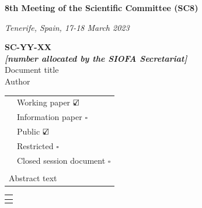 \documentclass[english,12pt,a4paper,final,twoside,titlepage,pdftex]{article}
\newcommand\CheckBoxTick{$\text{\rlap{$\checkmark$}}\square$}
\newcommand\CheckBoxUntick{$\square$}
\begin{document}
	\sloppy %

	
  \begin{center}
		\thispagestyle{firststyle}
		\vspace*{2cm}
		\small{\textbf{8th Meeting of the Scientific Committee (SC8)}}

		\vspace*{0.25cm}
		\emph{Tenerife, Spain, 17-18 March 2023}
		
		\vspace*{1cm}
		\textbf{SC-YY-XX\\ \emph{[number allocated by the SIOFA Secretariat]}}\\
		\vspace*{0.5cm}	
		\huge{Document title} \\
		\vspace*{1cm}	
		\large{Author}
  \end{center}

	\begin{table}[H]
	  \begin{tabular}{|m{4cm}|m{10cm}|}
		  \hline
	  	\textbf{\color{blue}{Document type}} &  Working paper \CheckBoxTick \\
	  	& Information paper \CheckBoxUntick \\
      \hline
      \textbf{\color{blue}{Distribution}} & Public \CheckBoxTick \\
      & Restricted \footnotemark[1] \CheckBoxUntick\\
      & Closed session document \footnotemark[2] \CheckBoxUntick\\
	  	\hline
			\multicolumn{2}{|l|}{\textbf{\color{blue}{Abstract}}} \\
			\hline
			\multicolumn{2}{|l|}{Abstract text} \\
			\hline
		\end{tabular}%
	\end{table}


  \newpage

	\begin{table}[H]
	  \begin{tabular}{|p{14.5cm}|}
	   	\hline
	  	\textbf{\color{blue}{Recommendations }}\color{blue}{(for proposals and working papers only)} \\
		  \hline
       \\
 		  \hline
 	  \end{tabular}%
  \end{table}
\end{document}
